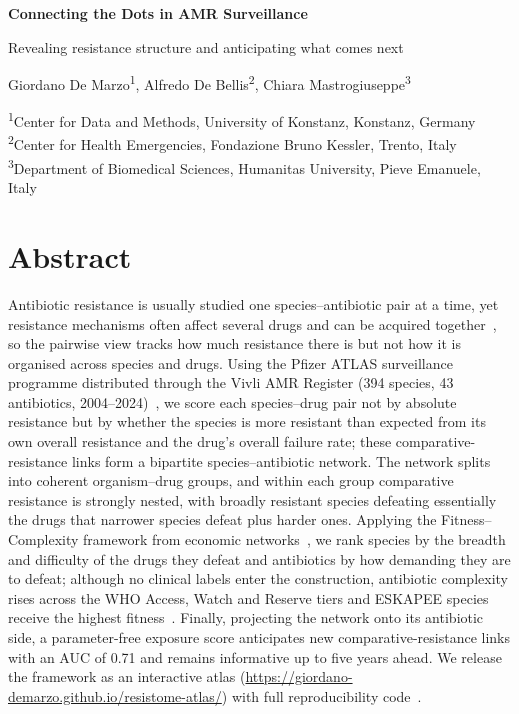 \documentclass[10pt]{article}
\begin{document}
\begin{center}
{\LARGE\bfseries\color{navy} Connecting the Dots in AMR Surveillance}\par
\vspace{1pt}
{\large\color{teal} Revealing resistance structure and anticipating what comes next}\par
\vspace{4pt}
{\normalsize
Giordano De Marzo\textsuperscript{1},
Alfredo De Bellis\textsuperscript{2},
Chiara Mastrogiuseppe\textsuperscript{3}}\par
\vspace{3pt}

{\small\color{gray}
\textsuperscript{1}Center for Data and Methods, University of Konstanz, Konstanz, Germany\\
\textsuperscript{2}Center for Health Emergencies, Fondazione Bruno Kessler, Trento, Italy\\
\textsuperscript{3}Department of Biomedical Sciences, Humanitas University, Pieve Emanuele, Italy
}\par
\end{center}
\vspace{-3pt}
\section*{Abstract}
Antibiotic resistance is usually studied one species--antibiotic pair at a time, yet resistance mechanisms often affect several drugs and can be acquired together~\cite{blair2015,partridge2018}, so the pairwise view tracks how much resistance there is but not how it is organised across species and drugs. Using the Pfizer ATLAS surveillance programme distributed through the Vivli AMR Register (394 species, 43 antibiotics, 2004--2024)~\cite{atlas}, we score each species--drug pair not by absolute resistance but by whether the species is more resistant than expected from its own overall resistance and the drug's overall failure rate; these comparative-resistance links form a bipartite species--antibiotic network. The network splits into coherent organism--drug groups, and within each group comparative resistance is strongly nested, with broadly resistant species defeating essentially the drugs that narrower species defeat plus harder ones. Applying the Fitness--Complexity framework from economic networks~\cite{tacchella2012}, we rank species by the breadth and difficulty of the drugs they defeat and antibiotics by how demanding they are to defeat; although no clinical labels enter the construction, antibiotic complexity rises across the WHO Access, Watch and Reserve tiers and ESKAPEE species receive the highest fitness~\cite{aware,kritsotakis2022}. Finally, projecting the network onto its antibiotic side, a parameter-free exposure score anticipates new comparative-resistance links with an AUC of 0.71 and remains informative up to five years ahead. We release the framework as an interactive atlas (\url{https://giordano-demarzo.github.io/resistome-atlas/}) with full reproducibility code~\cite{resistomeatlasrepo}.
\end{document}
